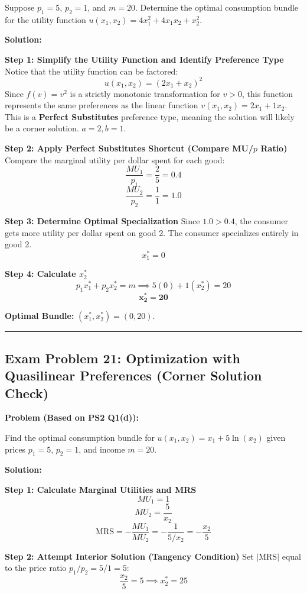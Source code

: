 \documentclass{article}
\begin{document}
Suppose $p_1 = 5$, $p_2 = 1$, and $m = 20$. Determine the optimal consumption bundle for the utility function $u(x_1, x_2) = 4x_1^2 + 4x_1x_2 + x_2^2$.

\textbf{Solution:}

\textbf{Step 1: Simplify the Utility Function and Identify Preference Type}
Notice that the utility function can be factored:
\[ u(x_1, x_2) = (2x_1 + x_2)^2 \]
Since $f(v) = v^2$ is a strictly monotonic transformation for $v > 0$, this function represents the same preferences as the linear function $v(x_1, x_2) = 2x_1 + 1x_2$. This is a \textbf{Perfect Substitutes} preference type, meaning the solution will likely be a corner solution. $a=2, b=1$.

\textbf{Step 2: Apply Perfect Substitutes Shortcut (Compare MU/$p$ Ratio)}
Compare the marginal utility per dollar spent for each good:
\[ \frac{MU_1}{p_1} = \frac{2}{5} = 0.4 \]
\[ \frac{MU_2}{p_2} = \frac{1}{1} = 1.0 \]

\textbf{Step 3: Determine Optimal Specialization}
Since $1.0 > 0.4$, the consumer gets more utility per dollar spent on good 2. The consumer specializes entirely in good 2.
\[ x_1^* = 0 \]

\textbf{Step 4: Calculate $x_2^*$}
\[ p_1 x_1^* + p_2 x_2^* = m \implies 5(0) + 1(x_2^*) = 20 \]
\[ \boldsymbol{x_2^* = 20} \]

\textbf{Optimal Bundle:} $(x_1^*, x_2^*) = (0, 20)$.

\bigskip\noindent\rule{\linewidth}{0.4pt}\bigskip

\subsection*{\textbf{Exam Problem 21: Optimization with Quasilinear Preferences (Corner Solution Check)}}

\textbf{Problem (Based on PS2 Q1(d)):}

Find the optimal consumption bundle for $u(x_1, x_2) = x_1 + 5 \ln(x_2)$ given prices $p_1=5$, $p_2=1$, and income $m=20$.

\textbf{Solution:}

\textbf{Step 1: Calculate Marginal Utilities and MRS}
\[ MU_1 = 1 \]
\[ MU_2 = \frac{5}{x_2} \]
\[ \text{MRS} = -\frac{MU_1}{MU_2} = -\frac{1}{5/x_2} = -\frac{x_2}{5} \]

\textbf{Step 2: Attempt Interior Solution (Tangency Condition)}
Set $|\text{MRS}|$ equal to the price ratio $p_1/p_2 = 5/1 = 5$:
\[ \frac{x_2}{5} = 5 \implies x_2^* = 25 \]
\end{document}
